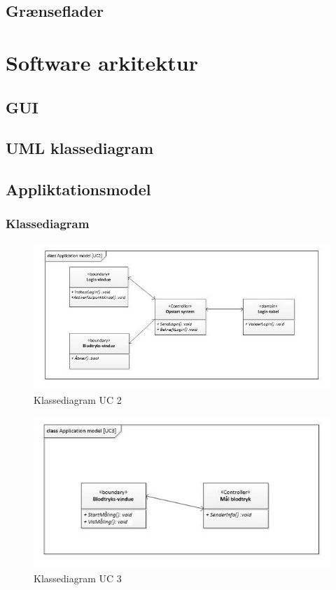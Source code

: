 \subsection{Grænseflader}

\section{Software arkitektur}

\subsection{GUI}

\subsection{UML klassediagram}


\subsection{Appliktationsmodel}

\subsubsection{Klassediagram}

\begin{figure}[H]
	\includegraphics[width=1\textwidth]{Figurer/classAppModelUC2}
	\caption{Klassediagram UC 2}
\end{figure}

\begin{figure}[H]
	\includegraphics[width=1\textwidth]{Figurer/classAppModelUC3}
	\caption{Klassediagram UC 3}
\end{figure}

